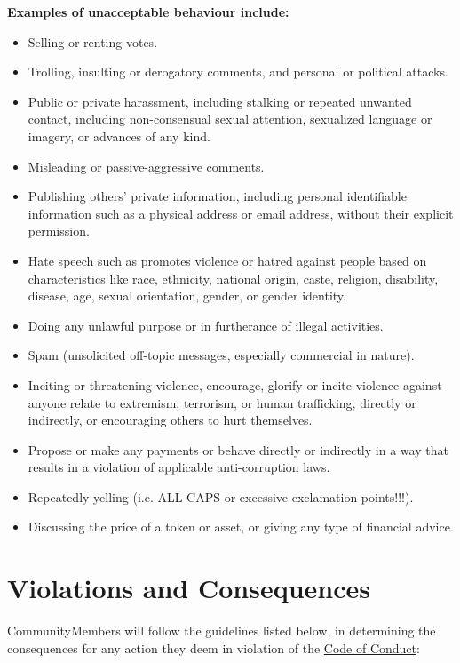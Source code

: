 \textbf{Examples of unacceptable behaviour include:}
\begin{itemize}
	\item Selling or renting votes.
	\item Trolling, insulting or derogatory comments, and personal or political attacks.
	\item Public or private harassment, including stalking or repeated unwanted contact, including non-consensual sexual attention, sexualized language or imagery, or advances of any kind.
	\item Misleading or passive-aggressive comments.
	\item Publishing others' private information, including personal identifiable information such as a physical address or email address, without their explicit permission.
	\item Hate speech such as promotes violence or hatred against people based on characteristics like race, ethnicity, national origin, caste, religion, disability, disease, age, sexual orientation, gender, or gender identity.
	\item Doing any unlawful purpose or in furtherance of illegal activities.
	\item Spam (unsolicited off-topic messages, especially commercial in nature).
	\item Inciting or threatening violence, encourage, glorify or incite violence against anyone relate to extremism, terrorism, or human trafficking, directly or indirectly, or encouraging others to hurt themselves.
	\item Propose or make any payments or behave directly or indirectly in a way that results in a violation of applicable anti-corruption laws.
	\item Repeatedly yelling (i.e. ALL CAPS or excessive exclamation points!!!).
	\item Discussing the price of a token or asset, or giving any type of financial advice.
\end{itemize}


\section{Violations and Consequences}
\label{sec:ViolationsAndConsequences}
	
\glspl{CommunityMember} will follow the guidelines listed below, in determining the consequences for any action they deem in violation of the \hyperref[sec:CodeOfConduct]{Code of Conduct}:

